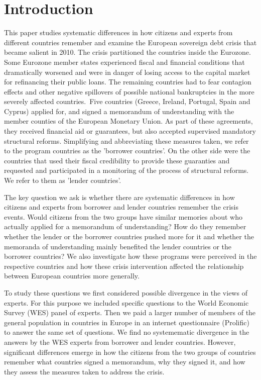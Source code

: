 \section{Introduction}
This paper studies systematic differences in how citizens and experts from
different countries remember and examine the European sovereign debt crisis
that became salient in 2010. The crisis partitioned the countries inside the
Eurozone. Some Eurozone member states experienced fiscal and financial
conditions that dramatically worsened and were in danger of losing access to
the capital market for refinancing their public loans. The remaining
countries had to fear contagion effects and other negative spillovers of
possible national bankruptcies in the more severely affected countries.\
Five countries (Greece, Ireland, Portugal, Spain and Cyprus) applied for,
and signed a memorandum of understanding with the member counties of the
European Monetary Union. As part of these agreements, they received
financial aid or guarantees, but also accepted supervised mandatory
structural reforms. Simplifying and abbreviating these measures taken, we
refer to the program countries as the 'borrower countries'. On the other
side were the countries that used their fiscal credibility to provide these
guaranties and requested and participated in a monitoring of the process of
structural reforms. We refer to them as 'lender countries'.

The key question we ask is whether there are systematic differences in how
citizens and experts from borrower and lender countries remember the crisis
events. Would citizens from the two groups have similar memories about who
actually applied for a memorandum of understanding? How do they remember
whether the lender or the borrower countries pushed more for it and whether
the memoranda of understanding mainly benefited the lender countries or the
borrower countries? We also investigate how these programs were perceived in the
respective countries and how these crisis intervention affected the
relationship between European countries more generally.\ 

To study these questions we first considered possible divergence in the
views of experts. For this purpose we included specific questions
to the World Economic Survey (WES) panel of experts. Then we paid a larger
number of members of the general population in countries in Europe in an
internet questionnaire (Prolific) to answer the same set of questions. We
find no systemematic divergence in the answers by the WES experts from borrower and lender countries. However, significant differences emerge in how
the citizens from the two groups of countries remember what countries signed
a memorandum, why they signed it, and how they assess the measures taken to
address the crisis.  

